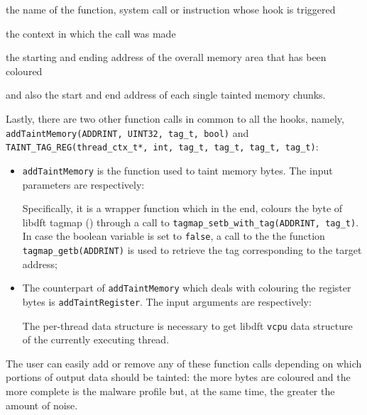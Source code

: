 \documentclass[LaM,binding=0.6cm]{sapthesis}
\begin{document}
\begin{enumerate*}[label=\roman*),itemjoin={,\quad}]
\item the name of the function, system call or instruction whose hook is triggered
\item the context in which the call was made
\item the starting and ending address of the overall memory area that has been coloured
\item and also the start and end address of each single tainted memory chunks.
\end{enumerate*}
Lastly, there are two other function calls in common to all the hooks, namely, \texttt{addTaintMemory(ADDRINT, UINT32, tag\_t, bool)} and \texttt{TAINT\_TAG\_REG(thread\_ctx\_t*, int, tag\_t, tag\_t, tag\_t, tag\_t)}:
\begin{itemize}
\item \texttt{addTaintMemory} is the function used to taint memory bytes. The input parameters are respectively: 
Specifically, it is a wrapper function which in the end, colours the byte of libdft tagmap () through a call to \texttt{tagmap\_setb\_with\_tag(ADDRINT, tag\_t)}. In case the boolean variable is set to \texttt{false}, a call to the the function \texttt{tagmap\_getb(ADDRINT)} is used to retrieve the tag corresponding to the target address;
\item The counterpart of \texttt{addTaintMemory} which deals with colouring the register bytes is \texttt{addTaintRegister}. The input arguments are respectively:
The per-thread data structure is necessary to get libdft \texttt{vcpu} data structure of the currently executing thread.
\end{itemize}
The user can easily add or remove any of these function calls depending on which portions of output data should be tainted: the more bytes are coloured and the more complete is the malware profile but, at the same time, the greater the amount of noise.\\
\end{document}

